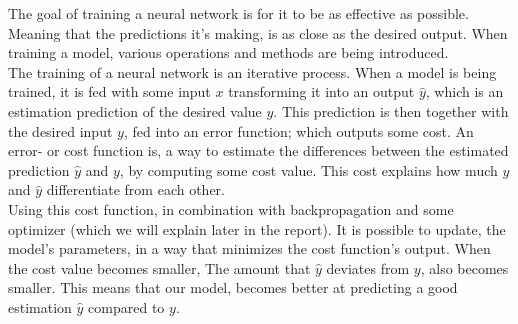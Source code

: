 The goal of training a neural network is for it to be as effective as possible. Meaning that the predictions it's making, is as close as the desired output. When training a model, various operations and methods are being introduced. \\

\noindent
The training of a neural network is an iterative process. When a model is being trained, it is fed with some input $x$ transforming it into an output $\hat{y}$, which is an estimation prediction of the desired value $y$. This prediction is then together with the desired input $y$, fed into an error function; which outputs some cost. An error- or cost function is, a way to estimate the differences between the estimated prediction $\hat{y}$ and $y$, by computing some cost value. This cost explains how much $y$ and $\hat{y}$ differentiate from each other.\\

\noindent
Using this cost function, in combination with backpropagation and some optimizer (which we will explain later in the report). It is possible to update, the model's parameters, in a way that minimizes the cost function's output. When the cost value becomes smaller, The amount that $\hat{y}$ deviates from $y$, also becomes smaller. This means that our model, becomes better at predicting a good estimation $\hat{y}$ compared to $y$.

